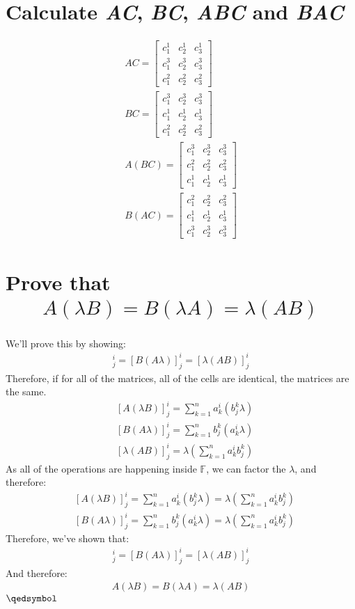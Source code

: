 \documentclass[a4paper, 12pt]{article}
\newcommand{\F}{\ensuremath{\mathbb{F}}}
\newcommand{\eq}[1]{\begin{align*}#1\end{align*}}
\renewcommand{\qed}{\hfill\(\qedsymbol\)}
\begin{document}
\begin{titlepage}
    
\end{titlepage}

\setcounter{section}{2}
\section{Calculate \textit{AC}, \textit{BC}, \textit{ABC} and \textit{BAC}}
\eq{
    AC=\begin{bmatrix}
        c^1_1 & c^1_2 & c^1_3 \\
        c^3_1 & c^3_2 & c^3_3 \\
        c^2_1 & c^2_2 & c^2_3
    \end{bmatrix}
    \\
    BC=\begin{bmatrix}
        c^3_1 & c^3_2 & c^3_3 \\
        c^1_1 & c^1_2 & c^1_3 \\
        c^2_1 & c^2_2 & c^2_3
    \end{bmatrix}
    \\
    A(BC)=\begin{bmatrix}
        c^3_1 & c^3_2 & c^3_3 \\
        c^2_1 & c^2_2 & c^2_3 \\
        c^1_1 & c^1_2 & c^1_3
    \end{bmatrix}
    \\
    B(AC)=\begin{bmatrix}
        c^2_1 & c^2_2 & c^2_3 \\
        c^1_1 & c^1_2 & c^1_3 \\
        c^3_1 & c^3_2 & c^3_3
    \end{bmatrix}
}

\setcounter{section}{5}
\section{Prove that \eq{A(\lambda{B})=B(\lambda{A})=\lambda(AB)}}
We'll prove this by showing:
\eq{
    [A(\lambda{B})]^i_j=[B(A\lambda)]^i_j=[\lambda(AB)]^i_j
}
Therefore, if for all of the matrices, all of the cells are identical, the matrices are the same.
\eq{
    &[A(\lambda{B})]^i_j=\sum^n_{k=1}a^i_k(b^k_j\lambda)\\
    &[B(A\lambda)]^i_j=\sum^n_{k=1}b^k_j(a^i_k\lambda)\\
    &[\lambda(AB)]^i_j=\lambda(\sum^n_{k=1}a^i_kb^k_j)
}
As all of the operations are happening inside $\F$, we can factor the $\lambda$, and therefore:
\eq{
    &[A(\lambda{B})]^i_j=\sum^n_{k=1}a^i_k(b^k_j\lambda)=\lambda(\sum^n_{k=1}a^i_kb^k_j)\\
    &[B(A\lambda)]^i_j=\sum^n_{k=1}b^k_j(a^i_k\lambda)=\lambda(\sum^n_{k=1}a^i_kb^k_j)
}
Therefore, we've shown that:
\eq{
    [A(\lambda{B})]^i_j=[B(A\lambda)]^i_j=[\lambda(AB)]^i_j
}
And therefore:
\eq{
    A(\lambda{B})=B(\lambda{A})=\lambda(AB)
}
\qed
\end{document}
